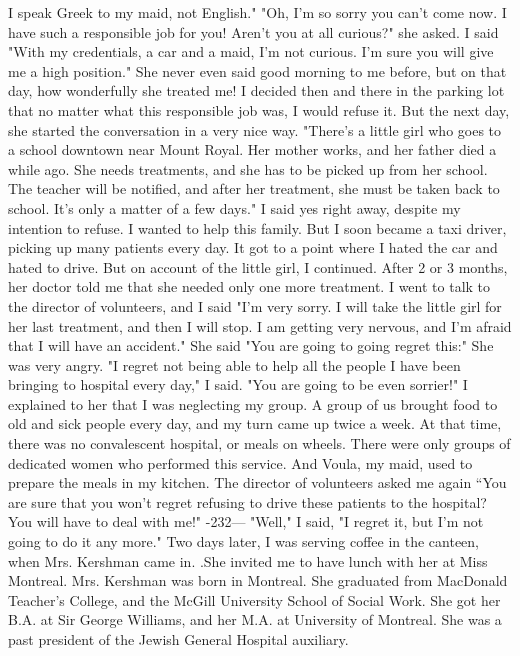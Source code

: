 I speak Greek to my maid, not English."
"Oh, I'm so sorry you can't come now.
I have such a responsible job for you!
Aren't you at all curious?"
she asked.
I said "With my credentials, a car and a maid, I'm not curious.
I'm sure you 
will give me a high position."
She never even said good morning to me before, but on that day, how wonderfully she treated me!
I decided then and there in the parking lot that no matter 
what this responsible job was, I would refuse it.
But the next day, she started the conversation in a very nice way.
"There's 
a little girl who goes to a school downtown near Mount Royal.
Her mother works, 
and her father died a while ago.
She needs treatments, and she has to be picked up 
from her school.
The teacher will be notified, and after her treatment, she must 
be taken back to school.
It's only a matter of a few days."
I said yes right away, despite my intention to refuse.
I wanted to help this 
family.
But I soon became a taxi driver, picking up many patients every day.
It 
got to a point where I hated the car and hated to drive.
But on account of the little
girl, I continued.
After 2 or 3 months, her doctor told me that she needed 
only one more treatment.
I went to talk to the director of volunteers, and I said 
"I'm very sorry.
I will take the little girl for her last treatment, and then I 
will stop.
I am getting very nervous, and I'm afraid that I will have an accident."
She said "You are going to going regret this:" She was very angry.
"I regret not being able to help all the people I have been bringing to hospital every day," I said.
"You are going to be even sorrier!"
I explained to her that I was neglecting my group.
A group of us brought 
food to old and sick people every day, and my turn came up twice a week.
At that 
time, there was no convalescent hospital, or meals on wheels.
There were only groups 
of dedicated women who performed this service.
And Voula, my maid, used to prepare 
the meals in my kitchen.
The director of volunteers asked me again “You are sure that you won't regret 
refusing to drive these patients to the hospital?
You will have to deal with me!"
-232— 
"Well," I said, "I regret it, but I'm not going to do it any more."
Two days later, I was serving coffee in the canteen, when Mrs.
Kershman came 
in.
.She invited me to have lunch with her at Miss Montreal.
Mrs.
Kershman was
born in Montreal.
She graduated from MacDonald Teacher's College, and the McGill 
University School of Social Work.
She got her B.A.
at Sir George Williams, and her 
M.A.
at University of Montreal.
She was a past president of the Jewish General Hospital auxiliary.
